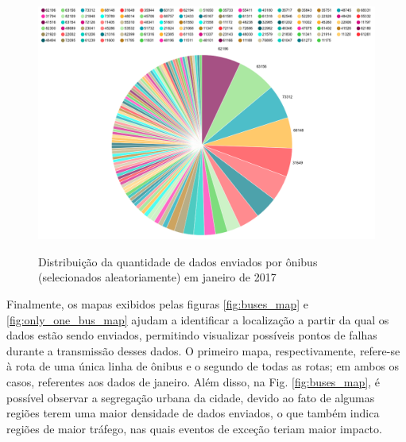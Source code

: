 \documentclass[
	12pt,				%
	oneside,			%
	a4paper,			%
	english,			%
	brazil				%
	]{abntex2ppgsi}
\begin{document}
{{\begin{figure}[!htb]%
	\centering
 	  \caption{Distribuição da quantidade de dados enviados por ônibus (selecionados aleatoriamente) em janeiro de 2017}
		\includegraphics[width=1\linewidth]{images/pizza_bus.png}
	\label{fig:pizza_bus}
\end{figure}

Finalmente, os mapas exibidos pelas figuras \ref {fig:buses_map} e \ref{fig:only_one_bus_map} ajudam a identificar a localização a partir da qual os dados estão sendo enviados, permitindo visualizar possíveis pontos de falhas durante a transmissão desses dados. O primeiro mapa, respectivamente, refere-se à rota de uma única linha de ônibus e o segundo de todas as rotas; em ambos os casos, referentes aos dados de janeiro. Além disso, na Fig. \ref {fig:buses_map}, é possível observar a segregação urbana da cidade, devido ao fato de algumas regiões terem uma maior densidade de dados enviados, o que também indica regiões de maior tráfego, nas quais eventos de exceção teriam maior impacto.

}}
\end{document}
